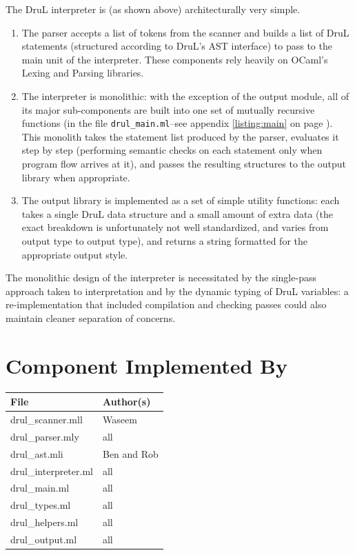The DruL interpreter is (as shown above) architecturally very simple.  
\begin{enumerate}
\item The parser accepts a list of tokens from the scanner and builds a list of 
DruL statements (structured according to DruL's AST interface)  to pass to the main unit of the interpreter.  These components rely heavily on OCaml's Lexing and Parsing libraries.
\item
The interpreter is monolithic: with the exception of the output module, all of its major sub-components are built into one set of mutually recursive functions (in the file {\tt drul\_main.ml}--see appendix \ref{listing:main} on page \pageref{listing:main}).   This monolith takes the statement list produced by the parser, evaluates it step by step (performing semantic checks on each statement only when program flow arrives at it), and passes the resulting structures to the output library when appropriate.
\item
The output library is implemented as a set of simple utility functions: each 
takes a single DruL data structure and a small amount of extra data
(the exact breakdown is unfortunately not well standardized, and varies from output type to 
output type), and returns a string formatted for the appropriate output style.
\end{enumerate}

The monolithic design of the interpreter is necessitated by the single-pass approach taken to 
interpretation and by the dynamic typing of DruL variables: a re-implementation that included  compilation and checking passes
 could also maintain cleaner separation of concerns.

\section{Component Implemented By}

\begin{tabular}{ | l | l | } \hline
	\textbf{File}        & \textbf{Author(s)} \\ \hline \hline
	drul\_scanner.mll    & Waseem             \\ \hline
	drul\_parser.mly     & all                \\ \hline
	drul\_ast.mli        & Ben and Rob        \\ \hline
	drul\_interpreter.ml & all                \\ \hline
	drul\_main.ml        & all                \\ \hline
	drul\_types.ml       & all                \\ \hline
	drul\_helpers.ml     & all                \\ \hline
	drul\_output.ml      & all                \\ \hline
\end{tabular}

